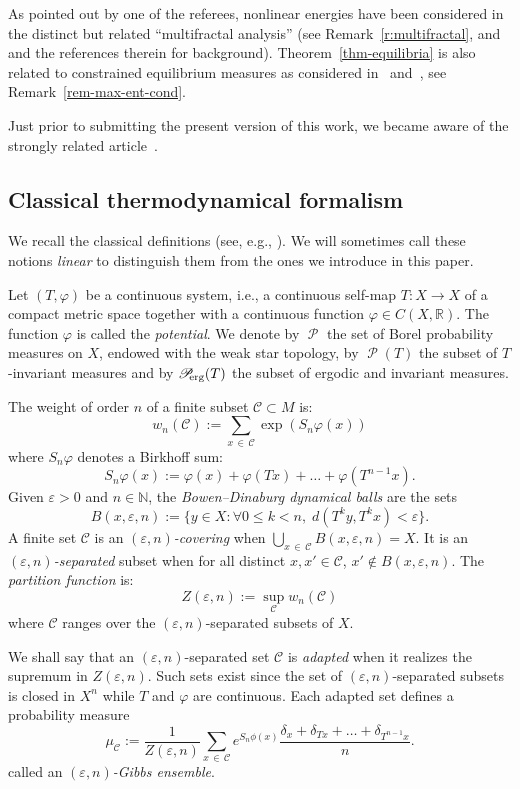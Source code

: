 \documentclass[AHL, Unicode, longabstracts,published]{cedram}
\theoremstyle{plain}
\theoremstyle{plain}
\newcommand\eps{\varepsilon}
\newcommand\Proberg{\Prob_{\kern-3pt\mathrm{erg}}}
\newcommand\Prob{{\operatorname{\mathscr{P}}}}
\newcommand{\pot}{\varphi}
\newcommand*\8{\infty}
\newcommand\NN{\mathbb{N}}
\newcommand\RR{\mathbb{R}}
\newcommand{\cC}{\mathcal C}
\let\oldforall\forall
\renewcommand*{\forall}{\mathrel{\oldforall}}
\begin{document}
As pointed out by one of the referees, nonlinear energies have been considered in the distinct but related ``multifractal analysis'' (see Remark~\ref{r:multifractal}, and~\cite{Climenhaga2014} and the references therein for background). Theorem~\ref{thm-equilibria} is also related to constrained equilibrium measures as considered in~\cite{KW2015} and~\cite{GKLM}, see Remark~\ref{rem-max-ent-cond}.

Just prior to submitting the present version of this work, we became aware of the strongly related article~\cite{BarreiraHolanda2021}.


\subsection{Classical thermodynamical formalism}
We recall the classical definitions (see, e.g., \cite{Walters-book}). We will sometimes call these notions \emph{linear} to distinguish them from the ones we introduce in this paper.


Let $(T,\pot)$ be a continuous system, i.e., a continuous self-map $T:X\to X$ of a compact metric space together with a continuous function $\pot \in C(X,\RR)$. The function $\pot$ is called the \emph{potential}. We denote by $\Prob$ the set of Borel probability measures on $X$, endowed with the weak star topology, by $\Prob(T)$ the subset of $T$-invariant measures and by $\Proberg(T)$ the subset of ergodic and invariant measures.


The weight of order $n$ of a finite subset $\cC\subset M$ is:
\[
w_n(\cC) := \sum_{x\,\in\,\cC} \exp \left(S_n\pot(x)\right)
\]
where $S_n\pot$ denotes a Birkhoff sum:
\[
S_n\pot(x):=\pot(x)+\pot(Tx)+\dots+\pot(T^{n-1}x).
\]
Given $\eps>0$ and $n\in\NN$, the \emph{Bowen--Dinaburg dynamical balls} are the sets
\[
B(x,\eps,n):=\big\{y\in X: \forall 0\leq k<n,\; d(T^ky,T^kx)<\eps \big\}.
\]
A finite set $\cC$ is an \emph{$(\eps,n)$-covering} when $\bigcup_{x\,\in\,\cC} B(x,\eps,n)=X$. It is an \emph{$(\eps,n)$-separated} subset when for all distinct $x, x'\in \cC$, $x'\notin B(x,\eps,n)$. The \emph{partition function} is:
\[
Z(\eps,n) := \sup_{\cC} w_n(\cC)
\]
where $\cC$ ranges over the $(\eps,n)$-separated subsets of $X$.

We shall say that an $(\eps,n)$-separated set $\cC$ is \emph{adapted} when it realizes the supremum in $Z(\eps,n)$. Such sets exist since the set of $(\eps,n)$-separated subsets is closed in $X^n$ while $T$ and $\varphi$ are continuous. Each adapted set defines a probability measure
\begin{equation}
\mu_{\cC} := \frac{1}{Z(\eps,n)} \sum_{x\,\in\,\cC} e^{S_n\phi(x)} \frac{\delta_x+\delta_{Tx}+\dots+\delta_{T^{n-1}x}}{n}.
\end{equation}
called an \emph{$(\eps,n)$-Gibbs ensemble}.
\end{document}
